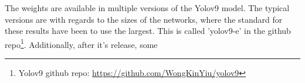 
The weights are available in multiple versions of the Yolov9 model. The typical versions are with regards to the sizes of the networks, where the standard for these results have been to use the largest. This is called 'yolov9-e' in the github repo\footnote{Yolov9 github repo: \href{https://github.com/WongKinYiu/yolov9}{https://github.com/WongKinYiu/yolov9}}. Additionally, after it's release, some

\label{sec:results_heatmaps}